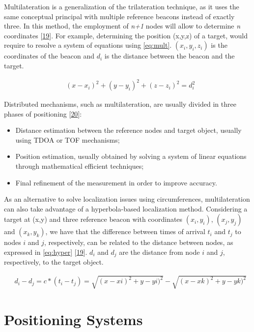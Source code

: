 Multilateration is a generalization of the trilateration technique, as it uses the same conceptual principal with multiple reference beacons instead of exactly three. In this method, the employment of \textit{n+1} nodes will allow to determine \textit{n} coordinates [\hyperref[r:r19]{19}]. For example, determining the position (x,y,z) of a target, would require to resolve a system of equations using \ref{eq:mult}. $(x_{i}, y_{i}, z_{i})$ is the coordinates of the beacon and $d_{i}$ is the distance between the beacon and the target.

\begin{eqnarray}
& (x - x_{i})^2 + (y - y_{i})^2 + (z - z_{i})^2 = d_{i}^2 
\label{eq:mult}
\end{eqnarray}

Distributed mechanisms, such as multilateration, are usually divided in three phases of positioning [\hyperref[r:r20]{20}]:
\begin{itemize}
	\item Distance estimation between the reference nodes and target object, usually using TDOA or TOF mechanisms;
	\item Position estimation, usually obtained by solving a system of linear equations through mathematical efficient techniques;
	\item Final refinement of the measurement in order to improve accuracy.
\end{itemize}

As an alternative to solve localization issues using circumferences, multilateration can also take advantage of a hyperbola-based localization method. Considering a target at (x,y) and three reference beacon with coordinates $(x_{i},y_{i})$,  $(x_{j},y_{j})$ and  $(x_{k},y_{k})$, we have that the difference between times of arrival $t_{i}$ and $t_{j}$ to nodes $i$ and $j$, respectively, can be related to the distance between nodes, as expressed in \ref{eq:hyper} [\hyperref[r:r19]{19}]. $d_{i}$ and $d_{j}$ are the distance from node $i$ and $j$, respectively, to the target object. 

\begin{eqnarray}
& d_{i} - d_{j} = c * (t_{i} - t_{j}) = \sqrt{(x - x{i})^2 + y - y{i})^2} - \sqrt{(x - x{k})^2 + y - y{k})^2}
\label{eq:hyper}
\end{eqnarray}


\section{Positioning Systems}

